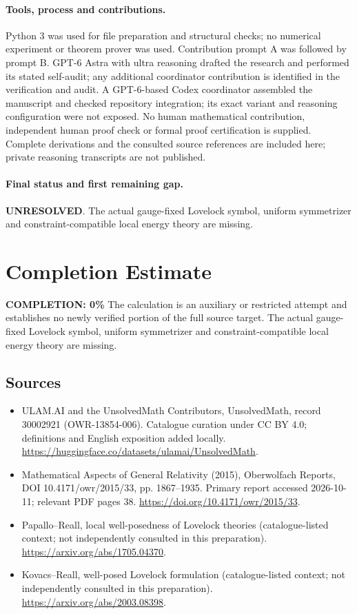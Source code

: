 \documentclass[11pt]{article}
\begin{document}
\paragraph{Tools, process and contributions.}
Python 3 was used for file preparation and structural checks; no numerical experiment or theorem prover was used. Contribution prompt A was followed by prompt B. GPT-6 Astra with ultra reasoning drafted the research and performed its stated self-audit; any additional coordinator contribution is identified in the verification and audit. A GPT-6-based Codex coordinator assembled the manuscript and checked repository integration; its exact variant and reasoning configuration were not exposed. No human mathematical contribution, independent human proof check or formal proof certification is supplied. Complete derivations and the consulted source references are included here; private reasoning transcripts are not published.

\paragraph{Final status and first remaining gap.}
\textbf{UNRESOLVED}. The actual gauge-fixed Lovelock symbol, uniform symmetrizer and constraint-compatible local energy theory are missing.

\section{Completion Estimate}
\noindent\textbf{COMPLETION: 0\%}
The calculation is an auxiliary or restricted attempt and establishes no newly verified portion of the full source target. The actual gauge-fixed Lovelock symbol, uniform symmetrizer and constraint-compatible local energy theory are missing.

\subsection{Sources}
\begin{itemize}
\item[\hypertarget{source:30002921:1}{S1}] ULAM.AI and the UnsolvedMath Contributors, UnsolvedMath, record 30002921 (OWR-13854-006). Catalogue curation under CC BY 4.0; definitions and English exposition added locally.
\url{https://huggingface.co/datasets/ulamai/UnsolvedMath}.
\item[\hypertarget{source:30002921:2}{S2}] Mathematical Aspects of General Relativity (2015), Oberwolfach Reports, DOI 10.4171/owr/2015/33, pp. 1867--1935. Primary report accessed 2026-10-11; relevant PDF pages 38.
\url{https://doi.org/10.4171/owr/2015/33}.
\item[\hypertarget{source:30002921:3}{S3}] Papallo--Reall, local well-posedness of Lovelock theories (catalogue-listed context; not independently consulted in this preparation).
\url{https://arxiv.org/abs/1705.04370}.
\item[\hypertarget{source:30002921:4}{S4}] Kovacs--Reall, well-posed Lovelock formulation (catalogue-listed context; not independently consulted in this preparation).
\url{https://arxiv.org/abs/2003.08398}.
\end{itemize}
\label{end:30002921}
\end{document}
